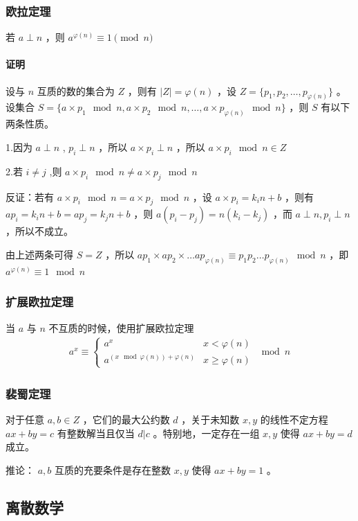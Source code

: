\documentclass[UTF-8]{ctexart}
\begin{document}
			\subsubsection{欧拉定理}
			若 $a \perp n$ ，则 $a^{\varphi(n)} \equiv 1\pmod{n}$
			\paragraph{证明}
			设与 $n$ 互质的数的集合为 $Z$ ，则有 $|Z|=\varphi(n)$ ，设 $Z=\lbrace p _ 1,p _ 2,\dots,p _ {\varphi(n)}\rbrace$ 。设集合 $S=\lbrace a \times p _ 1 \mod{n},a \times p _ 2 \mod{n},\dots,a \times p _ {\varphi(n)} \mod{n} \rbrace$ ，则 $S$ 有以下两条性质。
	
			1.因为 $a \perp n$ , $p _ i \perp n$ ，所以 $a \times p _ i \perp n$ ，所以 $a \times p _ i \mod{n} \in Z$
	
			2.若 $i \neq j$ ,则 $a \times p _ i \mod{n} \neq a \times p _ j \mod{n}$ 
	
			反证：若有 $a \times p _ i \mod{n} = a \times p _ j \mod{n}$ ，设 $a \times p _ i=k _ in+b$ ，则有 $a p _ i=k _ in+b=ap _ j=k _ jn+b$ ，则 $a(p _ i-p _ j)=n(k _ i-k _ j)$ ，而 $a \perp n,p _ i \perp n$ ，所以不成立。
	
			由上述两条可得 $S=Z$ ，所以 $ap _ 1 \times ap _ 2 \times \dots ap _ {\varphi(n)} \equiv p _ 1 p _ 2 \dots p _ {\varphi(n)} \mod{n}$ ，即 $a^{\varphi(n)} \equiv 1 \mod{n}$ 
			\subsubsection{扩展欧拉定理}
			当 $a$ 与 $n$ 不互质的时候，使用扩展欧拉定理
			\begin{align}
			a ^ x \equiv \begin{cases} a ^ x & x < \varphi(n) \nonumber\\ a ^ {(x \mod \varphi(n))+\varphi(n)} & x \ge \varphi(n) \end{cases} \mod n\nonumber
			\end{align}
			\subsubsection{裴蜀定理}
			对于任意 $a,b \in Z$ ，它们的最大公约数 $d$ ，关于未知数 $x,y$ 的线性不定方程 $ax+by=c$ 有整数解当且仅当 $d|c$ 。特别地，一定存在一组 $x,y$ 使得 $ax+by=d$ 成立。
	
			推论： $a,b$ 互质的充要条件是存在整数 $x,y$ 使得 $ax+by=1$ 。
		\subsection{离散数学}
\end{document}
